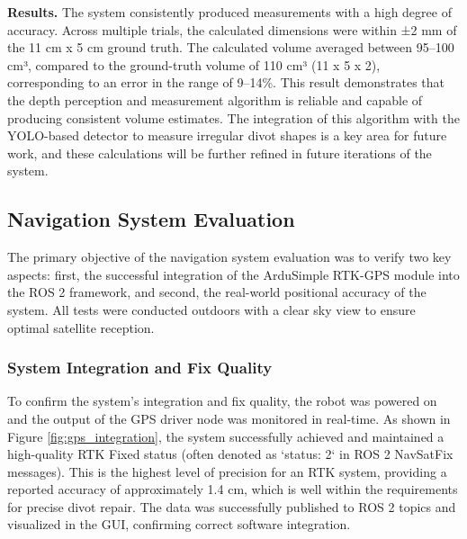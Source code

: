 \textbf{Results.}
The system consistently produced measurements with a high degree of accuracy. 
Across multiple trials, the calculated dimensions were within ±2 mm of the 11 cm x 5 cm ground truth. 
The calculated volume averaged between 95–100 cm³, compared to the ground-truth volume of 110 cm³ (11 x 5 x 2), corresponding to an error in the range of 9–14\%. This result demonstrates that the depth perception and measurement algorithm is reliable and capable of producing consistent volume estimates. The integration of this algorithm with the YOLO-based detector to measure irregular divot shapes is a key area for future work, and these calculations will be further refined in future iterations of the system.




\subsection{Navigation System Evaluation}
\label{ssec:nav_evaluation}

The primary objective of the navigation system evaluation was to verify two key aspects: first, the successful integration of the ArduSimple RTK-GPS module into the ROS 2 framework, and second, the real-world positional accuracy of the system. All tests were conducted outdoors with a clear sky view to ensure optimal satellite reception.

\subsubsection{System Integration and Fix Quality}
To confirm the system's integration and fix quality, the robot was powered on and the output of the GPS driver node was monitored in real-time. As shown in Figure \ref{fig:gps_integration}, the system successfully achieved and maintained a high-quality RTK Fixed status (often denoted as `status: 2` in ROS 2 NavSatFix messages). This is the highest level of precision for an RTK system, providing a reported accuracy of approximately 1.4 cm, which is well within the requirements for precise divot repair. The data was successfully published to ROS 2 topics and visualized in the GUI, confirming correct software integration.

